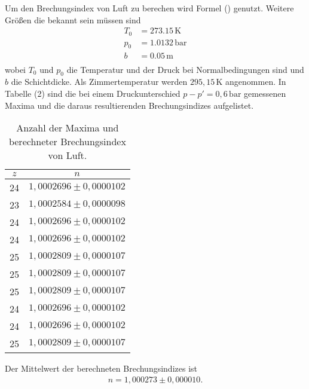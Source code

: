 Um den Brechungsindex von Luft zu berechen wird Formel () genutzt. Weitere Größen die bekannt sein müssen sind
\begin{align*}
T_0 &= 273.15 \,\si{\kelvin}\\
p_0 &= 1.0132 \,\si{\bar}\\
b &= 0.05 \,\si{\meter}\\
\end{align*}
wobei $T_0$ und $p_0$ die Temperatur und der Druck bei Normalbedingungen sind und $b$ die Schichtdicke.
Als Zimmertemperatur werden $295,15 \,\si{\kelvin}$ angenommen.
In Tabelle (2) sind die bei einem Druckunterschied $p-p'= 0,6 \,\si{\bar}$ gemessenen Maxima und die daraus resultierenden Brechungsindizes aufgelistet.
\begin{table}[H]
\centering
\caption{Anzahl der Maxima und berechneter Brechungsindex von Luft.}
\label{tab:einzel1}
\begin{tabular}{c c}
\toprule
$z$ & $n$\\
\midrule
24 & $1,0002696 \pm 0,0000102$ \\
23 & $1,0002584 \pm 0,0000098$ \\
24 & $1,0002696 \pm 0,0000102$ \\
24 & $1,0002696 \pm 0,0000102$ \\
25 & $1,0002809 \pm 0,0000107$ \\
25 & $1,0002809 \pm 0,0000107$ \\
25 & $1,0002809 \pm 0,0000107$ \\
24 & $1,0002696 \pm 0,0000102$ \\
24 & $1,0002696 \pm 0,0000102$ \\
25 & $1,0002809 \pm 0,0000107$ \\
\bottomrule
\end{tabular}
\end{table}
Der Mittelwert der berechneten Brechungsindizes ist
\begin{align*}
n = 1,000273 \pm 0,000010 .
\end{align*}

